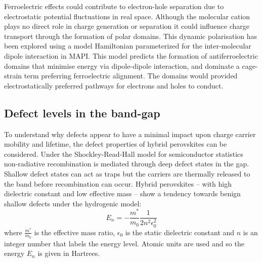 Ferroelectric effects could contribute to electron-hole separation due to electrostatic potential fluctuations in real space.
Although the molecular cation plays no direct role in charge generation or separation it could influence charge transport through the formation of polar domains.\autocite{Frost2014b,Ma2014d}
This dynamic polarisation has been explored using a model Hamiltonian parameterized for the inter-molecular dipole interaction in MAPI.\autocite{Frost2014}
This model predicts the formation of antiferroelectric domains that minimise energy via dipole-dipole interaction, and dominate a cage-strain term preferring ferroelectric alignment.\autocite{Leguy2015b}
The domains would provided electrostatically preferred pathways for electrons and holes to conduct.


\subsection{Defect levels in the band-gap}\label{defects}

To understand why defects appear to have a minimal impact upon charge carrier mobility and lifetime,\autocite{Brandt2015a} the defect properties of hybrid perovskites can be considered.
Under the Shockley-Read-Hall model for semiconductor statistics non-radiative recombination is mediated through deep defect states in the gap.\autocite{PhysRev.87.835}
Shallow defect states can act as traps but the carriers are thermally released to the band before recombination can occur.
Hybrid perovskites -- with high dielectric constant and low effective mass -- show a tendency towards benign shallow defects under the hydrogenic model:\autocite{Yu1996}
%
\begin{equation} \label{hydeqn}
E_n = - \frac{m^*}{m_0}\frac{1}{2n^2\epsilon_0^2}
\end{equation}
%
where $\frac{m^*}{m_0}$ is the effective mass ratio, $\epsilon_0$ is the static dielectric constant and $n$ is an integer number that labels the energy level. Atomic units are used and so the energy $E_n$ is given in Hartrees. 

